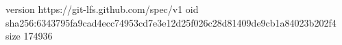 version https://git-lfs.github.com/spec/v1
oid sha256:6343795fa9cad4ecc74953cd7e3e12d25f026c28d81409de9cb1a84023b202f4
size 174936
